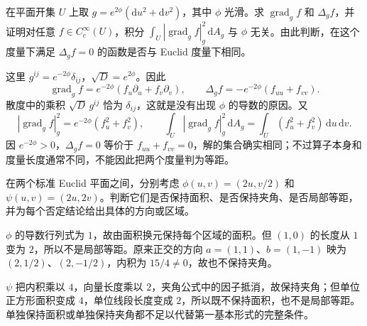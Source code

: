 \begin{exercise}\label{g1:ex:conformal-laplacian}
	在平面开集 \(U\) 上取 \(g=e^{2\phi}(\mathrm{d}u^2+\mathrm{d}v^2)\)，其中 \(\phi\) 光滑。求 \(\operatorname{grad}_gf\) 和 \(\Delta_gf\)，并证明对任意 \(f\in C_c^\infty(U)\)，积分 \(\int_U|\operatorname{grad}_gf|_g^2\,\mathrm{d}A_g\) 与 \(\phi\) 无关。由此判断，在这个度量下满足 \(\Delta_gf=0\) 的函数是否与 Euclid 度量下相同。
\end{exercise}
\begin{solution}
	这里 \(g^{ij}=e^{-2\phi}\delta_{ij}\)，\(\sqrt D=e^{2\phi}\)。因此
	\[
		\operatorname{grad}_gf=e^{-2\phi}(f_u\partial_u+f_v\partial_v),\qquad
		\Delta_gf=-e^{-2\phi}(f_{uu}+f_{vv}).
	\]
	散度中的乘积 \(\sqrt D\,g^{ij}\) 恰为 \(\delta_{ij}\)，这就是没有出现 \(\phi\) 的导数的原因。又
	\[
		|\operatorname{grad}_gf|_g^2=e^{-2\phi}(f_u^2+f_v^2),
		\qquad
		\int_U|\operatorname{grad}_gf|_g^2\,\mathrm{d}A_g
		=\int_U(f_u^2+f_v^2)\,\mathrm{d}u\,\mathrm{d}v.
	\]
	因 \(e^{-2\phi}>0\)，\(\Delta_gf=0\) 等价于 \(f_{uu}+f_{vv}=0\)，解的集合确实相同；不过算子本身和度量长度通常不同，不能因此把两个度量判为等距。
\end{solution}

\begin{exercise}\label{g1:ex:area-angle-not-isometry}
	在两个标准 Euclid 平面之间，分别考虑 \(\phi(u,v)=(2u,v/2)\) 和 \(\psi(u,v)=(2u,2v)\)。判断它们是否保持面积、是否保持夹角、是否局部等距，并为每个否定结论给出具体的方向或区域。
\end{exercise}
\begin{solution}
	\(\phi\) 的导数行列式为 \(1\)，故由面积换元保持每个区域的面积。但 \((1,0)\) 的长度从 \(1\) 变为 \(2\)，所以不是局部等距。原来正交的方向 \(a=(1,1)\)、\(b=(1,-1)\) 映为 \((2,1/2)\)、\((2,-1/2)\)，内积为 \(15/4\ne0\)，故也不保持夹角。

	\(\psi\) 把内积乘以 \(4\)，向量长度乘以 \(2\)，夹角公式中的因子抵消，故保持夹角；但单位正方形面积变成 \(4\)，单位线段长度变成 \(2\)，所以既不保持面积，也不是局部等距。单独保持面积或单独保持夹角都不足以代替第一基本形式的完整条件。
\end{solution}

